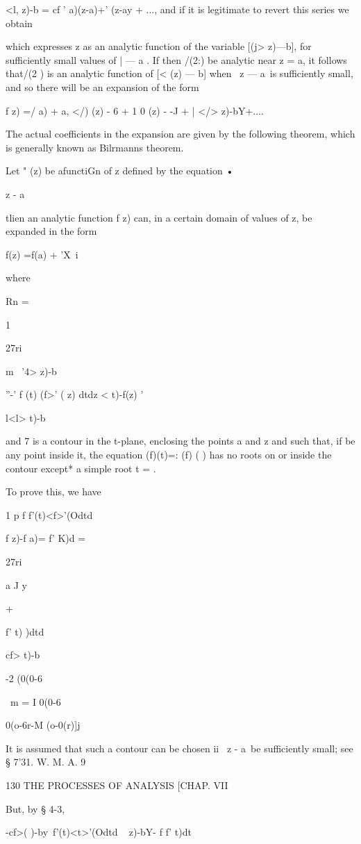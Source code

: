 <l, z)-b = cf ' a)(z-a)+' (z-ay + ..., and if it is legitimate to
revert this series we obtain

which expresses z as an analytic function of the variable [(j> z)—b],
for sufficiently small values of | — a . If then /(2:) be analytic
near z = a, it follows that/(2 ) is an analytic function of [< (z) —
b] when \ z — a\ is sufficiently small, and so there will be an
expansion of the form

f z) =/ a) + a, </) (z) - 6 + 1 0 (z) - -J + | </> z)-bY+....

The actual coefficients in the expansion are given by the following
theorem, which is generally known as Bilrmanns theorem.

Let " (z) be afunctiGn of z defined by the equation •

z - a

tlien an analytic function f z) can, in a certain domain of values of
z, be expanded in the form

f(z) =f(a) + 'X\ i %

where

Rn =

1

27ri

m \ '4> z)-b

''-' f (t) (f>' ( z) dtdz < t)-f(z) '

l<l> t)-b\

and 7 is a contour in the t-plane, enclosing the points a and z and
such that, if be any point inside it, the equation (f)(t)=: (f) ( )
has no roots on or inside the contour except* a simple root t = .

To prove this, we have

1 p f f'(t)<f>'(Odtd

f z)-f a)= f' K)d =

27ri

a J y

+

f' t) )dtd

cf> t)-b

-2 (0(0-6

\ m = I 0(0-6

 0(o-6r-M (o-0(r)]j

It is assumed that such a contour can be chosen ii \ z - a\ be
sufficiently small; see § 7'31. W. M. A. 9

130 THE PROCESSES OF ANALYSIS [CHAP. VII

But, by § 4-3,

-cf>( )-by\ f'(t)<t>'(Odtd \ < > z)-bY- f f' t)dt

